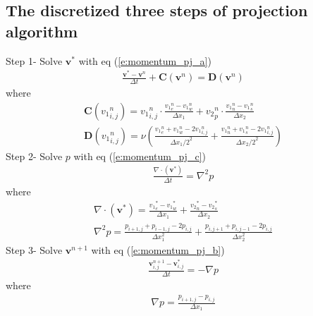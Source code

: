 \documentclass[11pt,dvips]{article}
\numberwithin{equation}{section}
\begin{document}
\subsection{The discretized three steps of projection algorithm}
Step 1- Solve $\mathbf{v}^{*}$ with eq (\ref{e:momentum_pj_a})
%
\begin{align}
\frac{\mathbf{v}^{*}-\mathbf{v}^{n}}{\Delta t}+\mathbf{C}(\mathbf{v}^{n})=
\mathbf{D}(\mathbf{v}^{{n}})  \nonumber
\end{align}
%
where
%
\begin{gather}
\mathbf{C}({v_1}^n_{i,j})={v_1}^n_{i,j} \cdot \frac{{v_1}^n_{e}-{v_1}^n_{w}}{\Delta x_1}+{v_2}^n_{p} 
\cdot \frac{{v_1}^n_{n}-{v_1}^n_{s}}{\Delta x_2} \\
\mathbf{D}({v_1}^n_{i,j})=\nu (\frac{{v_1}^n_{e}+ {v_1}^n_{w}-2{v_1}^n_{i,j}}{{\Delta x_1/2}^2}
+\frac{{v_1}^n_{n}+ {v_1}^n_{s}-2{v_1}^n_{i,j}}{{\Delta x_2/2}^2})
\end{gather}
%
Step 2- Solve $p$ with eq (\ref{e:momentum_pj_c})
%
\begin{align}
\frac{\nabla \cdot(\mathbf{v}^{*})}{\Delta t}=\nabla ^2 p \nonumber
\end{align}
%
where
%
\begin{gather}
\nabla \cdot(\mathbf{v}^{*})=\frac{{v_1}^{*}_{e}-{v_1}^{*}_{w}}{\Delta x_1}
+\frac{{v_2}^{*}_{n}-{v_2}^{*}_{s}}{\Delta x_2} \\
\nabla ^2 p=\frac{p_{i+1,j}+p_{i-1,j}-2p_{i,j}}{\Delta x_1^2}+\frac{p_{i,j+1}
+p_{i,j-1}-2p_{i,j}}{\Delta x_2^2}
\end{gather}
%
Step 3- Solve $\mathbf{v}^{n+1}$ with eq (\ref{e:momentum_pj_b})
%
\begin{align}
\frac{\mathbf{v}^{n+1}_{i,j}-\mathbf{v}^{*}_{i,j}}{\Delta t}=-\nabla p \nonumber
\end{align}
%
where
%
\begin{align}
\nabla p=\frac{p_{i+1,j}-p_{i,j}}{\Delta x_1}
\end{align}

\clearpage


\end{document}
